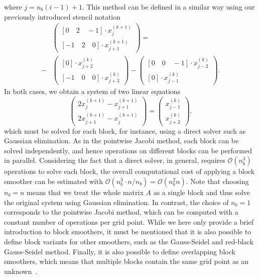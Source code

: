 where $j = n_b (i - 1) + 1$.
This method can be defined in a similar way using our previously introduced stencil notation
\begin{equation}
\begin{split}
	& \begin{pmatrix}
		\left[0 \quad 2 \quad -1 \right] \cdot x_{j}^{(k+1)} \\ \left[ -1 \quad 2 \quad 0 \right] \cdot x_{j+1}^{(k+1)} 
	\end{pmatrix}
	= \\ - & 
	\begin{pmatrix}
		\left[ 0 \right] \cdot x_{j+2}^{(k)} \\ \left[-1 \quad 0 \quad 0 \right] \cdot x_{j + 3}^{(k)}
	\end{pmatrix} -
	\begin{pmatrix}
		\left[0 \quad 0 \quad -1 \right] \cdot x_{j-2}^{(k)} \\ \left[ 0 \right] \cdot x_{j-1}^{(k)} 
	\end{pmatrix}.
\end{split}
\end{equation}
In both cases, we obtain a system of two linear equations
\begin{equation}
	\begin{pmatrix}
		2 x_{j}^{(k+1)} - x_{j+1}^{(k+1)} \\ 2 x_{j+1}^{(k+1)} - x_{j}^{(k+1)} 
	\end{pmatrix}
	=
	\begin{pmatrix}
		x_{j - 1}^{(k)} \\ x_{j + 2}^{(k)}
	\end{pmatrix}.
\end{equation}
which must be solved for each block, for instance, using a direct solver such as Gaussian elimination.
As in the pointwise Jacobi method, each block can be solved independently, and hence operations on different blocks can be performed in parallel. 
Considering the fact that a direct solver, in general, requires $\mathcal{O}(n_b^3)$ operations to solve each block, the overall computational cost of applying a block smoother can be estimated with $\mathcal{O}(n_b^3 \cdot n / n_b) = \mathcal{O}(n_b^2 n)$.
Note that choosing $n_b = n$ means that we treat the whole matrix $A$ as a single block and thus solve the original system using Gaussian elimination.
In contrast, the choice of $n_b = 1$ corresponds to the pointwise Jacobi method, which can be computed with a constant number of operations per grid point.
While we here only provide a brief introduction to block smoothers, it must be mentioned that it is also possible to define block variants for other smoothers, such as the Gauss-Seidel and red-black Gauss-Seidel method.
Finally, it is also possible to define overlapping block smoothers, which means that multiple blocks contain the same grid point as an unknown~\cite{trottenberg2000multigrid}.
